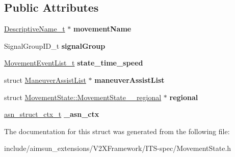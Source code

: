 \subsection*{Public Attributes}
\begin{DoxyCompactItemize}
\item 
\hyperlink{structOCTET__STRING}{Descriptive\+Name\+\_\+t} $\ast$ {\bfseries movement\+Name}\hypertarget{structMovementState_af89e23e4cd2597011503425d4495e7ee}{}\label{structMovementState_af89e23e4cd2597011503425d4495e7ee}

\item 
Signal\+Group\+I\+D\+\_\+t {\bfseries signal\+Group}\hypertarget{structMovementState_aa4e27ff24e198f54f12437c99b9f9be3}{}\label{structMovementState_aa4e27ff24e198f54f12437c99b9f9be3}

\item 
\hyperlink{structMovementEventList}{Movement\+Event\+List\+\_\+t} {\bfseries state\+\_\+time\+\_\+speed}\hypertarget{structMovementState_a127da9bb655d2bc39c00790173327903}{}\label{structMovementState_a127da9bb655d2bc39c00790173327903}

\item 
struct \hyperlink{structManeuverAssistList}{Maneuver\+Assist\+List} $\ast$ {\bfseries maneuver\+Assist\+List}\hypertarget{structMovementState_ac88ae3b37ee2600bb11f85820d7c9165}{}\label{structMovementState_ac88ae3b37ee2600bb11f85820d7c9165}

\item 
struct \hyperlink{structMovementState_1_1MovementState____regional}{Movement\+State\+::\+Movement\+State\+\_\+\+\_\+regional} $\ast$ {\bfseries regional}\hypertarget{structMovementState_a2537326f436f65a0656f3e73fa904706}{}\label{structMovementState_a2537326f436f65a0656f3e73fa904706}

\item 
\hyperlink{structasn__struct__ctx__s}{asn\+\_\+struct\+\_\+ctx\+\_\+t} {\bfseries \+\_\+asn\+\_\+ctx}\hypertarget{structMovementState_a11436ff8f7cdadccaad4357fd12d15f9}{}\label{structMovementState_a11436ff8f7cdadccaad4357fd12d15f9}

\end{DoxyCompactItemize}


The documentation for this struct was generated from the following file\+:\begin{DoxyCompactItemize}
\item 
include/aimsun\+\_\+extensions/\+V2\+X\+Framework/\+I\+T\+S-\/spec/Movement\+State.\+h\end{DoxyCompactItemize}
